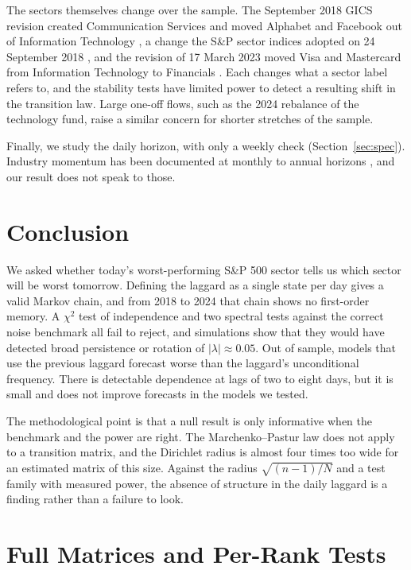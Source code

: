\documentclass[11pt]{article}
\begin{document}
The sectors themselves change over the sample. The September 2018 GICS revision created Communication Services and moved Alphabet and Facebook out of Information Technology \cite{msci2018}, a change the S\&P sector indices adopted on 24 September 2018 \cite{thinkadvisor2018}, and the revision of 17 March 2023 moved Visa and Mastercard from Information Technology to Financials \cite{spdji2023}. Each changes what a sector label refers to, and the stability tests have limited power to detect a resulting shift in the transition law. Large one-off flows, such as the 2024 rebalance of the technology fund, raise a similar concern for shorter stretches of the sample.

Finally, we study the daily horizon, with only a weekly check (Section~\ref{sec:spec}). Industry momentum has been documented at monthly to annual horizons \cite{moskowitzgrinblatt1999}, and our result does not speak to those.

\clearpage
\section{Conclusion}
\label{sec:conclusion}

We asked whether today's worst-performing S\&P 500 sector tells us which sector will be worst tomorrow. Defining the laggard as a single state per day gives a valid Markov chain, and from 2018 to 2024 that chain shows no first-order memory. A $\chi^2$ test of independence and two spectral tests against the correct noise benchmark all fail to reject, and simulations show that they would have detected broad persistence or rotation of $|\lambda| \approx 0.05$. Out of sample, models that use the previous laggard forecast worse than the laggard's unconditional frequency. There is detectable dependence at lags of two to eight days, but it is small and does not improve forecasts in the models we tested.

The methodological point is that a null result is only informative when the benchmark and the power are right. The Marchenko--Pastur law does not apply to a transition matrix, and the Dirichlet radius is almost four times too wide for an estimated matrix of this size. Against the radius $\sqrt{(n-1)/N}$ and a test family with measured power, the absence of structure in the daily laggard is a finding rather than a failure to look.

\appendix
\clearpage
\section{Full Matrices and Per-Rank Tests}
\label{app:matrices}
\end{document}
